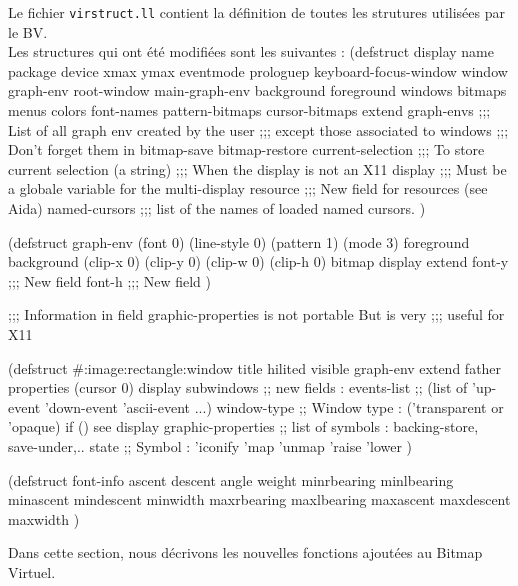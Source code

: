 Le fichier {\tt virstruct.ll} contient la d\'{e}finition de toutes les strutures
utilis\'{e}es par le BV.\\
Les structures qui ont \'{e}t\'{e} modifi\'{e}es sont les suivantes :
\BeginLL
(defstruct display
  name
  package
  device
  xmax
  ymax 
  eventmode
  prologuep
  keyboard-focus-window
  window
  graph-env
  root-window
  main-graph-env
  background
  foreground
  windows
  bitmaps
  menus
  colors         
  font-names     
  pattern-bitmaps
  cursor-bitmaps 
  extend
  graph-envs        ;;; List of all graph env created by the user
                    ;;; except those associated to windows
                    ;;; Don't forget them in bitmap-save bitmap-restore
  current-selection ;;; To store current selection (a string) 
                    ;;; When the display is not an X11 display
                    ;;; Must be a globale variable for the multi-display
  resource          ;;; New field for resources (see Aida)
  named-cursors     ;;; list of the names of loaded named cursors.
  )

(defstruct graph-env 
  (font 0)
  (line-style 0)
  (pattern 1)
  (mode 3)
  foreground 
  background
  (clip-x 0)
  (clip-y 0)
  (clip-w 0)
  (clip-h 0)
  bitmap
  display
  extend
  font-y ;;; New field
  font-h ;;; New field
  )


;;; Information in field graphic-properties is not portable But is very
;;; useful for X11

(defstruct #:image:rectangle:window
  title
  hilited
  visible
  graph-env
  extend
  father
  properties
  (cursor 0)
  display
  subwindows
  ;; new fields :
  events-list     ;; (list of 'up-event 'down-event  'ascii-event  ...)
  window-type     ;; Window type : ('transparent or 'opaque) if () see display
  graphic-properties ;; list of symbols : backing-store, save-under,..
  state           ;; Symbol : 'iconify 'map 'unmap 'raise 'lower
  )


(defstruct font-info
  ascent
  descent
  angle
  weight
  minrbearing
  minlbearing
  minascent
  mindescent
  minwidth
  maxrbearing
  maxlbearing
  maxascent
  maxdescent
  maxwidth
  )
\EndLL





Dans cette section, nous d\'{e}crivons les nouvelles fonctions ajout\'{e}es au Bitmap
Virtuel.\\



